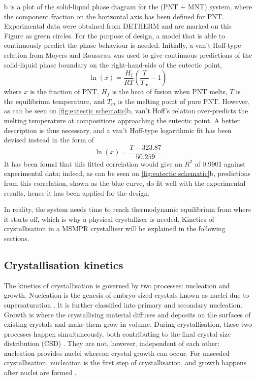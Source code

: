 b is a plot of the solid-liquid phase diagram for the (PNT + MNT) system, where the component fraction on the horizontal axis has been defined for PNT. Experimental data were obtained from DETHERM \cite{noauthor_detherm_2021} and are marked on this Figure as green circles. For the purpose of design, a model that is able to continuously predict the phase behaviour is needed. Initially, a van't Hoff-type relation from Moyers and Rousseau was used to give continuous predictions of the solid-liquid phase boundary on the right-hand-side of the eutectic point, \cite{moyers_crystallization_1987}
\begin{equation}\label{eq:vantHoff}
    \ln(x) = \frac{H_{\mathrm{f}}}{R T}\left(\frac{T}{T_{\mathrm{m}}} - 1\right)
\end{equation}
where $x$ is the fraction of PNT, $H_f$ is the heat of fusion when PNT melts, $T$ is the equilibrium temperature, and $T_{m}$ is the melting point of pure PNT. However, as can be seen on \cref{fig:eutectic schematic}b, van't Hoff's relation over-predicts the melting temperature at compositions approaching the eutectic point. A better description is thus necessary, and a van't Hoff-type logarithmic fit has been devised instead in the form of 
\begin{equation} \label{eq:fittedvantHoffcorrelation}
    \ln(x) = \frac{T - 323.87}{50.259}
\end{equation}
It has been found that this fitted correlation would give an $R^2$ of 0.9901 against experimental data; indeed, as can be seen on \cref{fig:eutectic schematic}b, predictions from this correlation, shown as the blue curve, do fit well with the experimental results, hence it has been applied for the design.

In reality, the system needs time to reach thermodynamic equilibrium from where it starts off, which is why a physical crystalliser is needed. Kinetics of crystallisation in a MSMPR crystalliser will be explained in the following sections.

\subsection{Crystallisation kinetics} \label{sec: Crystallisation kinetics}
The kinetics of crystallisation is governed by two processes: nucleation and growth. Nucleation is the genesis of embryo-sized crystals known as nuclei due to supersaturation \cite{richardson_chemical_2006}. It is further classified into primary and secondary nucleation. Growth is where the crystallising material diffuses and deposits on the surfaces of existing crystals and make them grow in volume. During crystallisation, these two processes happen simultaneously, both contributing to the final crystal size distribution (CSD) \cite{richardson_chemical_2006}. They are not, however, independent of each other: nucleation provides nuclei whereon crystal growth can occur. For unseeded crystallisation, nucleation is the first step of crystallisation, and growth happens after nuclei are formed \cite{mullin_crystallization_2001}.

